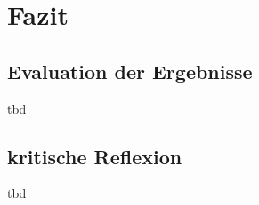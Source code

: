 \documentclass[
  12 pt,
]{article}
\begin{document}
\newpage

\hypertarget{fazit}{%
\section{Fazit}\label{fazit}}

\hypertarget{evaluation-der-ergebnisse}{%
\subsection{Evaluation der Ergebnisse}\label{evaluation-der-ergebnisse}}

tbd

\hypertarget{kritische-reflexion}{%
\subsection{kritische Reflexion}\label{kritische-reflexion}}

tbd
\end{document}

